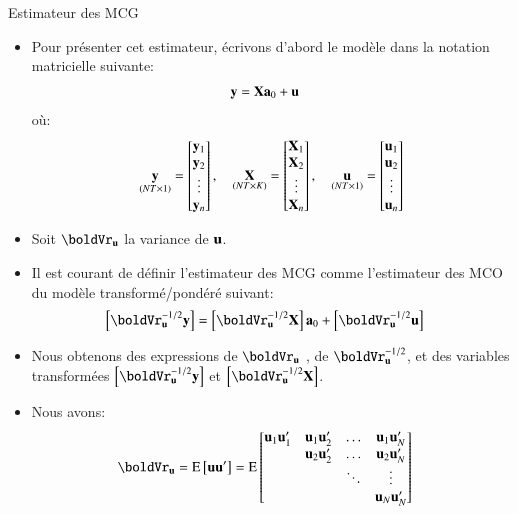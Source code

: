 \begin{frame}[allowframebreaks]{Estimateur des MCG}
    \begin{itemize}
        \item Pour présenter cet estimateur, écrivons d'abord le modèle dans la notation matricielle suivante:
        \begin{align*}
            {\mathbf y} &= \mathbf X {\mathbf a}_0 + {\mathbf u}
            \end{align*}
            où:
            \begin{align*}
            \underset{(NT\times 1)}{{\mathbf y}}  = \begin{bmatrix}
            {\mathbf y}_1\\
            {\mathbf y}_2\\
            \vdots\\
            {\mathbf y}_n
            \end{bmatrix}
            ,\quad
            \underset{(NT\times K)}{\mathbf X}  = \begin{bmatrix}
            \mathbf X_1\\
            \mathbf X_2\\
            \vdots\\
            \mathbf X_n
            \end{bmatrix}
            ,\quad
            \underset{(NT\times 1)}{{\mathbf u}}  = \begin{bmatrix}
            {\mathbf u}_1\\
            {\mathbf u}_2\\
            \vdots\\
            {\mathbf u}_n
        \end{bmatrix}
            \end{align*}
    \item Soit $\boldVr_{\boldu}$ la variance de  ${\mathbf u}$. 
    \item Il est courant de définir l'estimateur des MCG comme l'estimateur des MCO du modèle transformé/pondéré suivant:
    \begin{align*}
        \left[\boldVr_{\boldu}^{-1/2}\boldy \right]&= \left[\boldVr_{\boldu}^{-1/2}\boldX\right]\bolda_0 + \left[\boldVr_{\boldu}^{-1/2}\boldu\right]
    \end{align*}
    \item Nous obtenons des expressions de $\boldVr_{\boldu}$ , de $\boldVr_{\boldu}^{-1/2}$, 
    et des variables transformées
    $\left[\boldVr_{\boldu}^{-1/2}\boldy \right]$ et $\left[\boldVr_{\boldu}^{-1/2}\boldX \right]$. 
    \item Nous avons:
    \begin{align*}
    \boldVr_{\boldu} &= \Exp\left[\boldu \boldu^\prime\right] = \Exp
    \begin{bmatrix}
    \boldu_1\boldu_1^\prime &\boldu_1\boldu_2^\prime &\ldots &\boldu_1\boldu_N^\prime\\
    &\boldu_2\boldu_2^\prime&\ldots&\boldu_2\boldu_N^\prime\\
    &&\ddots&\vdots\\
    &&&\boldu_N\boldu_N^\prime
    \end{bmatrix}
    \end{align*}


\end{itemize}
\end{frame}
